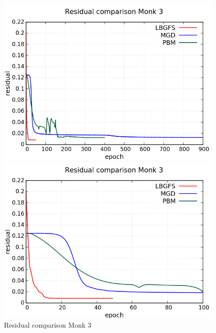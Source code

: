 \begin{figure}[H]
	\centering
	\begin{minipage}[t]{0.5\linewidth}
		\includegraphics[width=\linewidth]{data/Comparison/Monk3/Monk3_R_Comparison_standard.png}
	\end{minipage}%
	\begin{minipage}[t]{0.5\linewidth}
		\includegraphics[width=\linewidth]{data/Comparison/Monk3/Monk3_R_Comparison_zoom.png}
	\end{minipage}
	\caption{Residual comparison Monk 3}
	\label{R-Monk3}
\end{figure}
